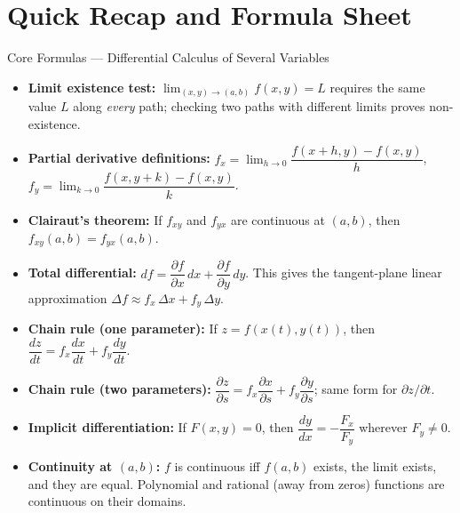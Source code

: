\documentclass[12pt,a4paper]{article}
\begin{document}
\section{Quick Recap and Formula Sheet}

\begin{learnbox}{Core Formulas --- Differential Calculus of Several Variables}
\begin{itemize}
  \item \textbf{Limit existence test:} \(\lim_{(x,y)\to(a,b)} f(x,y) = L\) requires the same value \(L\) along \emph{every} path; checking two paths with different limits proves non-existence.
  \item \textbf{Partial derivative definitions:}
    \(f_x = \lim_{h\to 0}\dfrac{f(x+h,y)-f(x,y)}{h}\), \quad
    \(f_y = \lim_{k\to 0}\dfrac{f(x,y+k)-f(x,y)}{k}\).
  \item \textbf{Clairaut's theorem:} If \(f_{xy}\) and \(f_{yx}\) are continuous at \((a,b)\), then \(f_{xy}(a,b) = f_{yx}(a,b)\).
  \item \textbf{Total differential:} \(df = \dfrac{\partial f}{\partial x}\,dx + \dfrac{\partial f}{\partial y}\,dy\). This gives the tangent-plane linear approximation \(\Delta f \approx f_x\,\Delta x + f_y\,\Delta y\).
  \item \textbf{Chain rule (one parameter):} If \(z = f(x(t),y(t))\), then \(\dfrac{dz}{dt} = f_x\dfrac{dx}{dt} + f_y\dfrac{dy}{dt}\).
  \item \textbf{Chain rule (two parameters):} \(\dfrac{\partial z}{\partial s} = f_x\dfrac{\partial x}{\partial s} + f_y\dfrac{\partial y}{\partial s}\); same form for \(\partial z/\partial t\).
  \item \textbf{Implicit differentiation:} If \(F(x,y)=0\), then \(\dfrac{dy}{dx} = -\dfrac{F_x}{F_y}\) wherever \(F_y \neq 0\).
  \item \textbf{Continuity at \((a,b)\):} \(f\) is continuous iff \(f(a,b)\) exists, the limit exists, and they are equal. Polynomial and rational (away from zeros) functions are continuous on their domains.
\end{itemize}
\end{learnbox}
\end{document}
